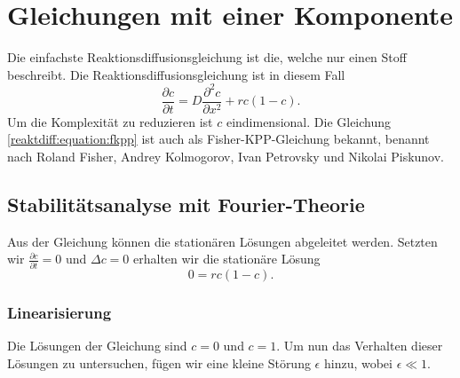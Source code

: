 %
%
%
%
\section{Gleichungen mit einer Komponente
\label{reaktdiff:section:einKomponent}}
Die einfachste Reaktionsdiffusionsgleichung ist die, welche nur einen Stoff beschreibt.
Die Reaktionsdiffusionsgleichung ist in diesem Fall
\begin{equation*}
\label{reaktdiff:equation:fkpp}
\frac{\partial c}{\partial t} = D \frac{\partial^2 c}{\partial x^2} + rc(1-c).
\end{equation*}
Um die Komplexität zu reduzieren ist \(c\) eindimensional. 
Die Gleichung \eqref{reaktdiff:equation:fkpp} ist auch als Fisher-KPP-Gleichung \cite{reaktdiff:wikipedia_kpp_fisher} bekannt, benannt nach Roland Fisher, Andrey Kolmogorov, Ivan Petrovsky und Nikolai Piskunov.

\subsection{Stabilitätsanalyse mit Fourier-Theorie
\label{reaktdiff:subsection:fkppmathe}}
Aus der Gleichung können die stationären Lösungen abgeleitet werden.
Setzten wir \(\frac{\partial c}{\partial t} = 0\) und \(\Delta c = 0\) erhalten wir die stationäre Lösung
\begin{equation*}
\label{reaktdiff:equation:stationaer}
0 = rc(1-c).
\end{equation*}

\subsubsection{Linearisierung}
Die Lösungen der Gleichung sind \(c = 0\) und \(c = 1\).
Um nun das Verhalten dieser Lösungen zu untersuchen, fügen wir eine kleine Störung \(\epsilon\) hinzu, wobei \(\epsilon \ll 1\).

